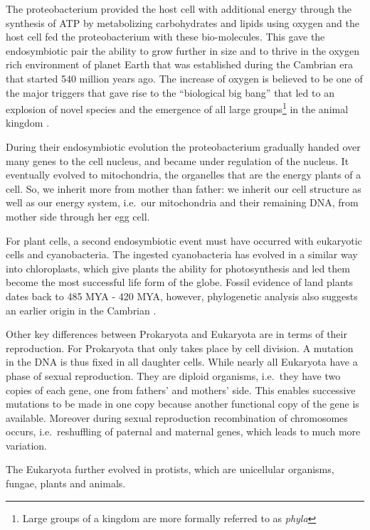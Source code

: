\documentclass[
  11pt,
]{book}
\begin{document}
The proteobacterium provided the host cell with additional energy through the synthesis of ATP by metabolizing carbohydrates and lipids using oxygen and the host cell fed the proteobacterium with these bio-molecules. This gave the endosymbiotic pair the ability to grow further in size and to thrive in the oxygen rich environment of planet Earth that was established during the Cambrian era that started 540 million years ago. The increase of oxygen is believed to be one of the major triggers that gave rise to the ``biological big bang'' that led to an explosion of novel species and the emergence of all large groups\footnote{Large groups of a kingdom are more formally referred to as \emph{phyla}} in the animal kingdom \citep{he2019}.

During their endosymbiotic evolution the proteobacterium gradually handed over many genes to the cell nucleus, and became under regulation of the nucleus. It eventually evolved to mitochondria, the organelles that are the energy plants of a cell. So, we inherit more from mother than father: we inherit our cell structure as well as our energy system, i.e.~our mitochondria and their remaining DNA, from mother side through her egg cell.

For plant cells, a second endosymbiotic event must have occurred with eukaryotic cells and cyanobacteria. The ingested cyanobacteria has evolved in a similar way into chloroplasts, which give plants the ability for photosynthesis and led them become the most successful life form of the globe. Fossil evidence of land plants dates back to 485 MYA - 420 MYA, however, phylogenetic analysis also suggests an earlier origin in the Cambrian \citep{StrotherFoster2021}.

Other key differences between Prokaryota and Eukaryota are in terms of their reproduction.
For Prokaryota that only takes place by cell division. A mutation in the DNA is thus fixed in all daughter cells. While nearly all Eukaryota have a phase of sexual reproduction. They are diploid organisms, i.e.~they have two copies of each gene, one from fathers' and mothers' side. This enables successive mutations to be made in one copy because another functional copy of the gene is available. Moreover during sexual reproduction recombination of chromosomes occurs, i.e.~reshuffling of paternal and maternal genes, which leads to much more variation.

The Eukaryota further evolved in protists, which are unicellular organisms, fungae, plants and animals.
\end{document}
